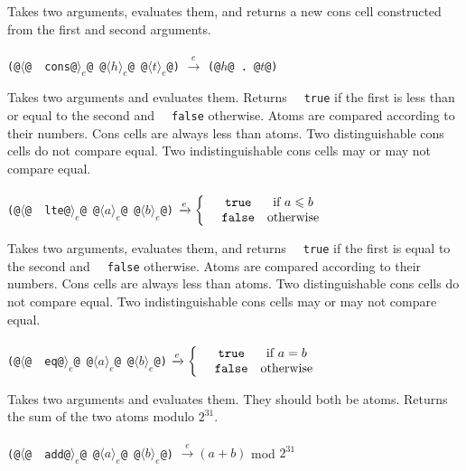 \documentclass[twocolumn]{report}
\begin{document}
\begin{description}[leftmargin=1.5cm,labelwidth=1.3cm]
\item [\texttt{~~cons}]
Takes two arguments, evaluates them, and returns a new cons cell constructed from the first and second arguments. \\
\\
\texttt{(@$\langle$@~~cons@$\rangle_{e}$@ @$\langle h \rangle_{e}$@ @$\langle t \rangle_{e}$@)} $\xrightarrow{e}$ \texttt{(@$h$@ . @$t$@)}

\item [\texttt{~~lte}]
Takes two arguments and evaluates them.
Returns \texttt{~~true} if the first is less than or equal to the second and \texttt{~~false} otherwise.
Atoms are compared according to their numbers.
Cons cells are always less than atoms.
Two distinguishable cons cells do not compare equal.
Two indistinguishable cons cells may or may not compare equal. \\
\\
\texttt{(@$\langle$@~~lte@$\rangle_{e}$@ @$\langle a \rangle_{e}$@ @$\langle b \rangle_{e}$@)} $\xrightarrow{e} \left\{\begin{matrix} \ \text{\texttt{~~true}} & \textrm{if } a \leqslant b \\ \ \text{\texttt{~~false}} & \textrm{otherwise} \end{matrix}\right.$

\item [\texttt{~~eq}]
Takes two arguments, evaluates them, and returns \texttt{~~true} if the first is equal to the second and \texttt{~~false} otherwise.
Atoms are compared according to their numbers.
Cons cells are always less than atoms.
Two distinguishable cons cells do not compare equal.
Two indistinguishable cons cells may or may not compare equal. \\
\\
\texttt{(@$\langle$@~~eq@$\rangle_{e}$@ @$\langle a \rangle_{e}$@ @$\langle b \rangle_{e}$@)} $\xrightarrow{e} \left\{\begin{matrix} \ \text{\texttt{~~true}} & \textrm{if } a = b \\ \ \text{\texttt{~~false}} & \textrm{otherwise} \end{matrix}\right.$

\item [\texttt{~~add}]
Takes two arguments and evaluates them.
They should both be atoms.
Returns the sum of the two atoms modulo $2^{31}$. \\
\\
\texttt{(@$\langle$@~~add@$\rangle_{e}$@ @$\langle a \rangle_{e}$@ @$\langle b \rangle_{e}$@)} $\xrightarrow{e} (a + b)$ mod $2^{31}$


\end{description}
\end{document}

